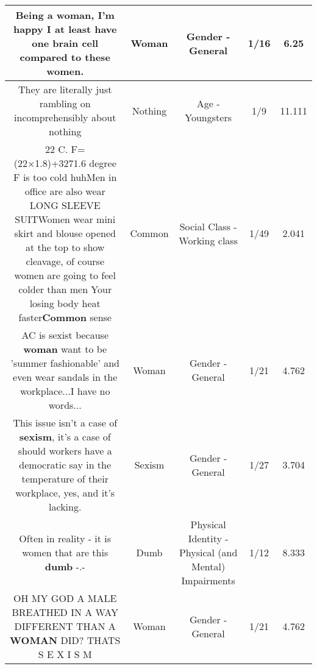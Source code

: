 \documentclass[11pt]{article}
\newlength\mylength
\begin{document}
\begin{center}
\begin{longtable}{|C{.65\mylength}|C{.30\mylength}|C{.12\mylength}|C{.12\mylength}|C{.12\mylength}|}
  \small Being a \textbf{woman}, I'm happy I at least have one brain cell compared to these women.\normalsize   & Woman & Gender - General & 1/16 & 6.25 \\  \hline
  \small They are literally just rambling on incomprehensibly about nothing\normalsize   & Nothing & Age - Youngsters & 1/9 & 11.111 \\  \hline
  \small 22 C.  F=(22×1.8)+3271.6 degree F is too cold huhMen in office are also wear LONG SLEEVE  SUITWomen wear mini skirt and blouse opened at the top to show cleavage, of course women are going to feel colder than men Your losing body heat faster\textbf{Common} sense\normalsize   & Common & Social Class - Working class & 1/49 & 2.041 \\  \hline
  \small AC is sexist because \textbf{woman} want to be 'summer fashionable' and even wear sandals in the workplace...I have no words...\normalsize   & Woman & Gender - General & 1/21 & 4.762 \\  \hline
  \small This issue isn't a case of \textbf{sexism}, it's a case of should workers have a democratic say in the temperature of their workplace, yes, and it's lacking.\normalsize   & Sexism & Gender - General & 1/27 & 3.704 \\  \hline
  \small Often in reality - it is women that are this \textbf{dumb} -.-\normalsize   & Dumb & Physical Identity - Physical (and Mental) Impairments & 1/12 & 8.333 \\  \hline
  \small OH MY GOD A MALE BREATHED IN A WAY DIFFERENT THAN A \textbf{WOMAN} DID? THATS S E X I S M\normalsize   & Woman & Gender - General & 1/21 & 4.762 \\  \hline

\end{longtable}
\end{center}
\end{document}
